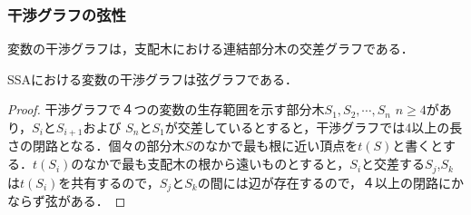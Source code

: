 \documentclass[ckj,dvipdfmx]{beamer}
\begin{document}
\begin{frame}
\frametitle{干渉グラフの弦性}


変数の干渉グラフは，支配木における連結部分木の交差グラフである．

\begin{Lem}
SSAにおける変数の干渉グラフは弦グラフである．
\end{Lem}

\begin{proof}
干渉グラフで４つの変数の生存範囲を示す部分木$S_1,S_2,\cdots,S_n$ $n\geq 4$があり，$S_i$と$S_{i+1}$および
$S_n$と$S_1$が交差しているとすると，干渉グラフでは4以上の長さの閉路となる．個々の部分木$S$のなかで最も根に近い頂点を$t(S)$と書くとする．$t(S_i)$のなかで最も支配木の根から遠いものとすると，$S_i$と交差する$S_j$,$S_k$は$t(S_i)$を共有するので，$S_j$と$S_k$の間には辺が存在するので，４以上の閉路にかならず弦がある．
\end{proof}

\end{frame}
\end{document}
